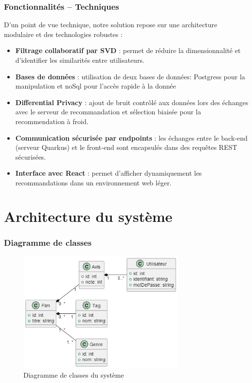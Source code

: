 \documentclass{beamer}
\begin{document}
    \begin{frame}
        \frametitle{Fonctionnalités – Techniques}
        \small
        D’un point de vue technique, notre solution repose sur une architecture modulaire et des technologies robustes :

        \begin{itemize}
            \item \textbf{Filtrage collaboratif par SVD} : permet de réduire la dimensionnalité et d’identifier les similarités entre utilisateurs.
            \item \textbf{Bases de données} : utilisation de deux bases de données: Postgress pour la manipulation et noSql pour l'accès rapide à la donnée
            \item \textbf{Differential Privacy} : ajout de bruit contrôlé aux données lors des échanges avec le serveur de recommandation et sélection biaisée pour la recommendation à froid.
            \item \textbf{Communication sécurisée par endpoints} : les échanges entre le back-end (serveur Quarkus) et le front-end sont encapsulés dans des requêtes REST sécurisées.
            \item \textbf{Interface avec React} : permet d’afficher dynamiquement les recommandations dans un environnement web léger.
        \end{itemize}

    \end{frame}



    \section{Architecture du système}
    \begin{frame}
        \frametitle{Diagramme de classes}
        \vspace{0.5cm}
        \begin{figure}
            \centering
            \includegraphics[width=0.75\textwidth]{classe.png}
            \caption{\small Diagramme de classes du système}
        \end{figure}
    \end{frame}
\end{document}
